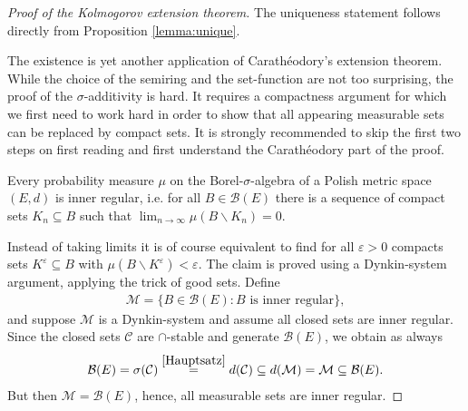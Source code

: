 \begin{proof}[Proof of the Kolmogorov extension theorem]
	The uniqueness statement follows directly from Proposition \ref{lemma:unique}.\smallskip

	The existence is yet another application of Carath\'eodory's extension theorem. While the choice of the semiring and the set-function are not too surprising, the proof of the $\sigma$-additivity is hard. It requires a compactness argument for which we first need to work hard in order to show that all appearing measurable sets can be replaced by compact sets. It is strongly recommended to skip the first two steps on first reading and first understand the Carath\'eodory part of the proof.
	\begin{lstep}
		Every probability measure $\mu$ on the Borel-$\sigma$-algebra of a Polish metric space $(E,d)$ is inner regular, i.e. for all $B\in \mathcal B(E)$ there is a sequence of compact sets $K_n\subseteq B$ such that $\lim_{n\to\infty}\mu(B\backslash K_n)= 0.$
	\end{lstep}
	Instead of taking limits it is of course equivalent to find for all $\varepsilon>0$ compacts sets $K^\varepsilon\subseteq B$ with $\mu(B\backslash K^\varepsilon)<\varepsilon$.	The claim is proved using a Dynkin-system argument, applying the trick of good sets. Define 
	\begin{align*}
		\mathcal M=\{B\in \mathcal B(E): B\text{ is inner regular}\},
	\end{align*}
	and suppose $\mathcal M$ is a Dynkin-system and assume all closed sets are inner regular. Since the closed sets $\mathcal C$ are $\cap$-stable and generate $\mathcal B(E)$, we obtain as always 
	\begin{align*}
		\mathcal B(E)=\sigma(\mathcal C)  \overset{\ref{Hauptsatz}}{=}d(\mathcal C)\subseteq d(\mathcal M)=\mathcal M \subseteq \mathcal B(E).
	\end{align*}
	But then $\mathcal M=\mathcal B(E)$, hence,	all measurable sets are inner regular.\smallskip
	

\end{proof}
